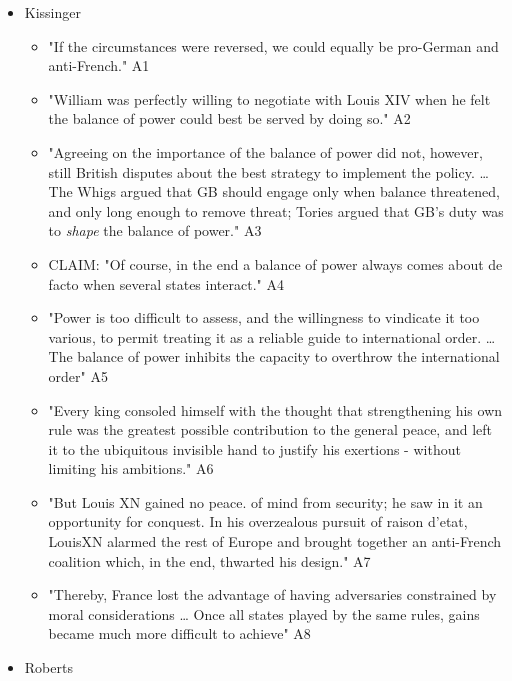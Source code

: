 \documentclass[letterpaper]{article}
\begin{document}
\begin{itemize}
\item Kissinger

\begin{itemize}
\item "If the circumstances were reversed, we could equally be pro-German
and anti-French." A1
\item "William was perfectly willing to negotiate with Louis XIV when he
felt the balance of power could best be served by doing so." A2
\item "Agreeing on the importance of the balance of power did not,
however, still British disputes about the best strategy to implement
the policy. \ldots{} The Whigs argued that GB should engage only when
balance threatened, and only long enough to remove threat; Tories
argued that GB's duty was to \emph{shape} the balance of power." A3
\item CLAIM: "Of course, in the end a balance of power always comes about
de facto when several states interact." A4
\item "Power is too difficult to assess, and the willingness to vindicate
it too various, to permit treating it as a reliable guide to
international order. \ldots{} The balance of power inhibits the capacity
to overthrow the international order" A5
\item "Every king consoled himself with the thought that strengthening his
own rule was the greatest possible contribution to the general
peace, and left it to the ubiquitous invisible hand to justify his
exertions - without limiting his ambitions." A6
\item "But Louis XN gained no peace. of mind from security; he saw in it
an opportunity for conquest. In his overzealous pursuit of raison
d'etat, LouisXN alarmed the rest of Europe and brought together an
anti-French coalition which, in the end, thwarted his design." A7
\item "Thereby, France lost the advantage of having adversaries
constrained by moral considerations \ldots{} Once all states played by
the same rules, gains became much more difficult to achieve" A8
\end{itemize}

\item Roberts


\end{itemize}
\end{document}
